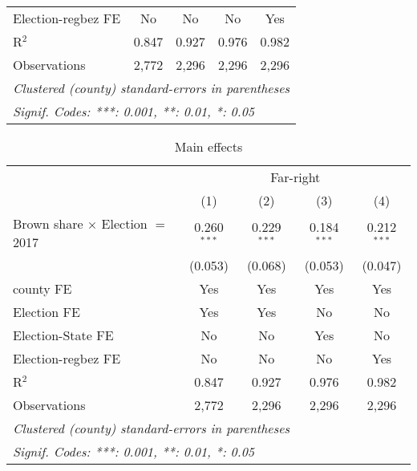 \begin{table}[htbp]
\begin{tabular}{lcccc}
      Election-regbez FE                      & No            & No            & No            & Yes\\  
      R$^2$                                   & 0.847         & 0.927         & 0.976         & 0.982\\  
      Observations                            & 2,772         & 2,296         & 2,296         & 2,296\\  
      \midrule \midrule
      \multicolumn{5}{l}{\emph{Clustered (county) standard-errors in parentheses}}\\
      \multicolumn{5}{l}{\emph{Signif. Codes: ***: 0.001, **: 0.01, *: 0.05}}\\
   \end{tabular}
\end{table}



\begin{table}[htbp]
   \caption{Main effects}
   \centering
   \begin{tabular}{lcccc}
      \tabularnewline \midrule \midrule
       & \multicolumn{4}{c}{Far-right}\\
                                              & (1)           & (2)           & (3)           & (4)\\  
      Brown share $\times$ Election $=$ 2017  & 0.260$^{***}$ & 0.229$^{***}$ & 0.184$^{***}$ & 0.212$^{***}$\\   
                                              & (0.053)       & (0.068)       & (0.053)       & (0.047)\\   
      county FE                               & Yes           & Yes           & Yes           & Yes\\  
      Election FE                             & Yes           & Yes           & No            & No\\  
      Election-State FE                       & No            & No            & Yes           & No\\  
      Election-regbez FE                      & No            & No            & No            & Yes\\  
      R$^2$                                   & 0.847         & 0.927         & 0.976         & 0.982\\  
      Observations                            & 2,772         & 2,296         & 2,296         & 2,296\\  
      \midrule \midrule
      \multicolumn{5}{l}{\emph{Clustered (county) standard-errors in parentheses}}\\
      \multicolumn{5}{l}{\emph{Signif. Codes: ***: 0.001, **: 0.01, *: 0.05}}\\
   \end{tabular}
\end{table}



